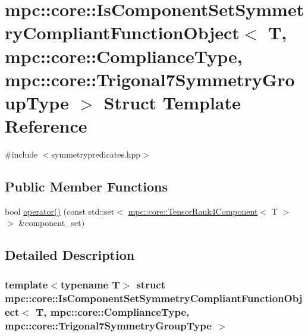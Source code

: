 \hypertarget{structmpc_1_1core_1_1_is_component_set_symmetry_compliant_function_object_3_01_t_00_01mpc_1_1corf68b74e952b553f9b8078bf1720fcdd4}{}\section{mpc\+:\+:core\+:\+:Is\+Component\+Set\+Symmetry\+Compliant\+Function\+Object$<$ T, mpc\+:\+:core\+:\+:Compliance\+Type, mpc\+:\+:core\+:\+:Trigonal7\+Symmetry\+Group\+Type $>$ Struct Template Reference}
\label{structmpc_1_1core_1_1_is_component_set_symmetry_compliant_function_object_3_01_t_00_01mpc_1_1corf68b74e952b553f9b8078bf1720fcdd4}


{\ttfamily \#include $<$symmetrypredicates.\+hpp$>$}

\subsection*{Public Member Functions}
\begin{DoxyCompactItemize}
\item 
bool \mbox{\hyperlink{structmpc_1_1core_1_1_is_component_set_symmetry_compliant_function_object_3_01_t_00_01mpc_1_1corf68b74e952b553f9b8078bf1720fcdd4_aac9a86ac565d872d11630e8d56a0aeb5}{operator()}} (const std\+::set$<$ \mbox{\hyperlink{namespacempc_1_1core_ac3a232afc7c680d580628e834030482f}{mpc\+::core\+::\+Tensor\+Rank4\+Component}}$<$ T $>$ $>$ \&component\+\_\+set)
\end{DoxyCompactItemize}


\subsection{Detailed Description}
\subsubsection*{template$<$typename T$>$\newline
struct mpc\+::core\+::\+Is\+Component\+Set\+Symmetry\+Compliant\+Function\+Object$<$ T, mpc\+::core\+::\+Compliance\+Type, mpc\+::core\+::\+Trigonal7\+Symmetry\+Group\+Type $>$}



